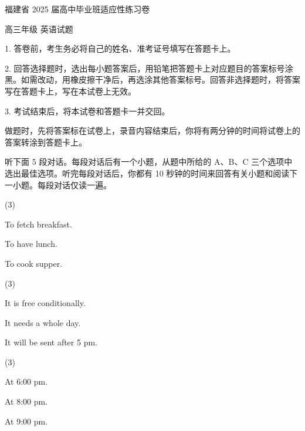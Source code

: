 \documentclass{英语试卷}
\begin{document}
\par 福建省 2025 届高中毕业班适应性练习卷\par
\par 高三年级 英语试题\par
\begin{notice}
\par 1. 答卷前，考生务必将自己的姓名、准考证号填写在答题卡上。\par
\par 2. 回答选择题时，选出每小题答案后，用铅笔把答题卡上对应题目的答案标号涂黑。如需改动，用橡皮擦干净后，再选涂其他答案标号。回答非选择题时，将答案写在答题卡上，写在本试卷上无效。\par
\par 3. 考试结束后，将本试卷和答题卡一并交回。\par
\end{notice}
\par 做题时，先将答案标在试卷上，录音内容结束后，你将有两分钟的时间将试卷上的答案转涂到答题卡上。\par
{}
\par 听下面 5 段对话。每段对话后有一个小题，从题中所给的 A、B、C 三个选项中选出最佳选项。听完每段对话后，你都有 10 秒钟的时间来回答有关小题和阅读下一小题。每段对话仅读一遍。\par
{}
\begin{choices}(3)
  \item To fetch breakfast.
  \item To have lunch.
  \item To cook supper.
\end{choices}
\begin{choices}(3)
  \item It is free conditionally.
  \item It needs a whole day.
  \item It will be sent after 5 pm.
\end{choices}
\begin{choices}(3)
  \item At 6:00 pm.
  \item At 8:00 pm.
  \item At 9:00 pm.
\end{choices}
\end{document}
